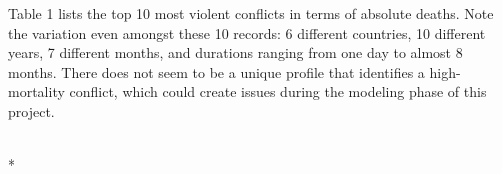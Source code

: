 \documentclass[letterpaper,10pt,english]{/usr/share/sphinx/texinputs/sphinxhowto}
\def\smaller{\fontsize{9.5pt}{9.5pt}\selectfont}
\begin{document}
        
    
Table 1 lists the top 10 most violent conflicts in terms of absolute
deaths. Note the variation even amongst these 10 records: 6 different
countries, 10 different years, 7 different months, and durations ranging
from one day to almost 8 months. There does not seem to be a unique
profile that identifies a high-mortality conflict, which could create
issues during the modeling phase of this project.


    
        \vspace{6pt}
        \makebox[0.1\linewidth]{\smaller\hfill\tt\color{nbframe-in-prompt}In\hspace{4pt}{[}22{]}:\hspace{4pt}}\\*
        \vspace{-2.65\baselineskip}
\end{document}
